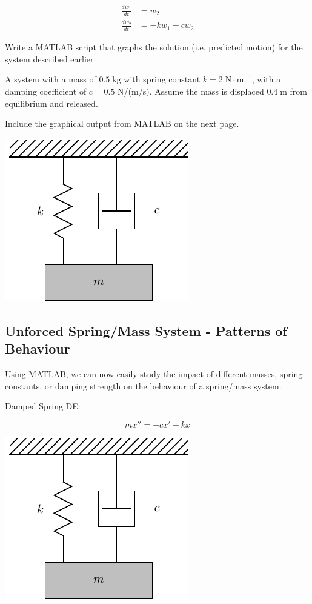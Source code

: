 \begin{align*}
  \frac{dw_1}{dt} & = w_2 \\
  \frac{dw_2}{dt} & = -k w_1 - c w_2
\end{align*}


\newpage 
\problem Write a MATLAB script that graphs the solution
(i.e. predicted motion) for the system described earlier:

A system with a mass of $0.5 \; \text{kg}$ with spring constant
$k = 2 \; \text{N} \cdot \text{m}^{-1}$, with a damping coefficient of
$c = 0.5$ N/(m/s).  Assume the mass is displaced $0.4 \; \text{m}$
from equilibrium and released.

Include the graphical output from MATLAB on the next page.

\newpage
\hfill
\includegraphics[width=0.3\linewidth]{graphics/notes_08_hanging_mass}


\newpage
{}
\subsection*{Unforced Spring/Mass System - Patterns of Behaviour}

Using MATLAB, we can now easily study the impact of different masses,
spring constants, or damping strength on the behaviour of a
spring/mass system.

\begin{minipage}[t]{0.4\linewidth}
\vspace{0pt}
Damped Spring DE:

$$ m x'' = -c x' -kx $$
\end{minipage}
\begin{minipage}[t]{0.6\linewidth}
\vspace{0pt}
\begin{center}
\includegraphics[width=0.4\linewidth]{graphics/notes_08_hanging_mass}
\end{center}
\end{minipage}

